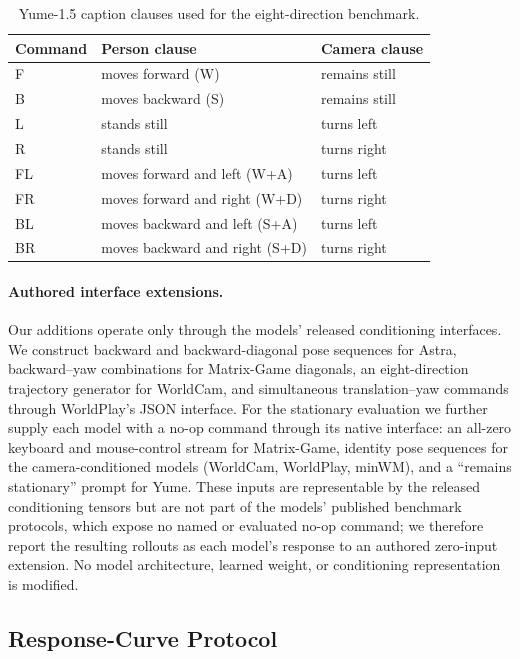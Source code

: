 \documentclass[letterpaper]{article} %
\begin{document}
\begin{table}[t]
\centering
\small
\caption{Yume-1.5 caption clauses used for the eight-direction benchmark.}
\label{tab:yume_commands}
\begin{tabular}{lll}
\toprule
Command & Person clause & Camera clause \\
\midrule
F  & moves forward (W)              & remains still \\
B  & moves backward (S)             & remains still \\
L  & stands still                    & turns left \\
R  & stands still                    & turns right \\
FL & moves forward and left (W+A)   & turns left \\
FR & moves forward and right (W+D)  & turns right \\
BL & moves backward and left (S+A)  & turns left \\
BR & moves backward and right (S+D) & turns right \\
\bottomrule
\end{tabular}
\end{table}

\paragraph{Authored interface extensions.}
Our additions operate only through the models' released conditioning
interfaces. We construct backward and backward-diagonal pose sequences for
Astra, backward--yaw combinations for Matrix-Game diagonals, an
eight-direction trajectory generator for WorldCam, and simultaneous
translation--yaw commands through WorldPlay's JSON interface. For the
stationary evaluation we further supply each model with a no-op command
through its native interface: an all-zero keyboard and mouse-control stream
for Matrix-Game, identity pose sequences for the camera-conditioned models
(WorldCam, WorldPlay, minWM), and a ``remains stationary'' prompt for Yume.
These inputs are representable by the released conditioning tensors but are
not part of the models' published benchmark protocols, which expose no named
or evaluated no-op command; we therefore report the resulting rollouts as
each model's response to an authored zero-input extension. No model
architecture, learned weight, or conditioning representation is modified.

\subsection{Response-Curve Protocol}
\label{app:response_details}
\end{document}
